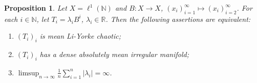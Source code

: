 \documentclass[12pt,a4paper]{amsart}
\theoremstyle{definition}
\theoremstyle{plain}
\newtheorem{prop}[defn]{Proposition}
\begin{document}
\begin{prop}
    Let $X=\ell^1(\mathbb{N})$ and $B\colon X\to X$, $(x_i)_{i=1}^\infty \mapsto (x_i)_{i=2}^\infty$.
    For each $i\in\mathbb{N}$, let $T_i=\lambda_i B^i$, $\lambda_i\in \mathbb{R}$.
    Then the following assertions are equivalent:
    \begin{enumerate}
        \item \label{prop1: mean LY chaotic}
             $(T_i)_i$ is mean Li-Yorke chaotic;
        \item \label{prop2: manifold}
             $(T_i)_i$ has a dense absolutely mean irregular manifold;
        \item \label{prop3: lambda unbounded}
               $\displaystyle
                  \limsup_{n\to\infty} \frac{1}{n} \sum_{i=1}^n |\lambda_i|=\infty$.
    \end{enumerate}
\end{prop}
\end{document}
